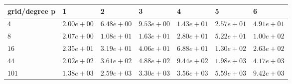 \begin{tabular}{lllllll}
\hline
 grid/degree p   & 1          & 2          & 3          & 4          & 5          & 6          \\
\hline
 $4$             & $2.00e+00$ & $6.48e+00$ & $9.53e+00$ & $1.43e+01$ & $2.57e+01$ & $4.91e+01$ \\
 $8$             & $2.07e+00$ & $1.08e+01$ & $1.63e+01$ & $2.80e+01$ & $5.22e+01$ & $1.00e+02$ \\
 $16$            & $2.35e+01$ & $3.19e+01$ & $4.06e+01$ & $6.88e+01$ & $1.30e+02$ & $2.63e+02$ \\
 $44$            & $2.02e+02$ & $3.61e+02$ & $4.88e+02$ & $9.44e+02$ & $1.98e+03$ & $4.17e+03$ \\
 $101$           & $1.38e+03$ & $2.59e+03$ & $3.30e+03$ & $3.56e+03$ & $5.59e+03$ & $9.42e+03$ \\
\hline
\end{tabular}